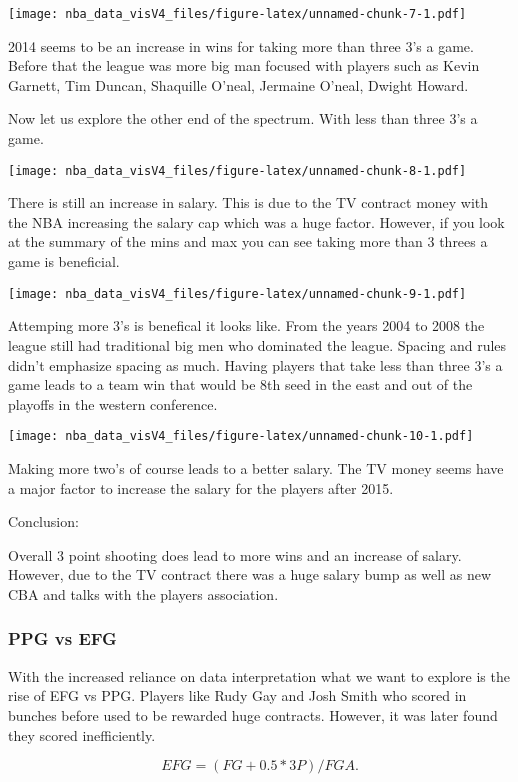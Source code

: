 \documentclass[]{article}
\begin{document}
\texttt{[image: nba\_data\_visV4\_files/figure-latex/unnamed-chunk-7-1.pdf]}

2014 seems to be an increase in wins for taking more than three 3's a
game. Before that the league was more big man focused with players such
as Kevin Garnett, Tim Duncan, Shaquille O'neal, Jermaine O'neal, Dwight
Howard.

Now let us explore the other end of the spectrum. With less than three
3's a game.

\texttt{[image: nba\_data\_visV4\_files/figure-latex/unnamed-chunk-8-1.pdf]}

There is still an increase in salary. This is due to the TV contract
money with the NBA increasing the salary cap which was a huge factor.
However, if you look at the summary of the mins and max you can see
taking more than 3 threes a game is beneficial.

\texttt{[image: nba\_data\_visV4\_files/figure-latex/unnamed-chunk-9-1.pdf]}

Attemping more 3's is benefical it looks like. From the years 2004 to
2008 the league still had traditional big men who dominated the league.
Spacing and rules didn't emphasize spacing as much. Having players that
take less than three 3's a game leads to a team win that would be 8th
seed in the east and out of the playoffs in the western conference.

\texttt{[image: nba\_data\_visV4\_files/figure-latex/unnamed-chunk-10-1.pdf]}

Making more two's of course leads to a better salary. The TV money seems
have a major factor to increase the salary for the players after 2015.

Conclusion:

Overall 3 point shooting does lead to more wins and an increase of
salary. However, due to the TV contract there was a huge salary bump as
well as new CBA and talks with the players association.

\subsubsection{PPG vs EFG}\label{ppg-vs-efg}

With the increased reliance on data interpretation what we want to
explore is the rise of EFG vs PPG. Players like Rudy Gay and Josh Smith
who scored in bunches before used to be rewarded huge contracts.
However, it was later found they scored inefficiently.

\[ EFG = (FG + 0.5 * 3P) / FGA. \]
\end{document}
